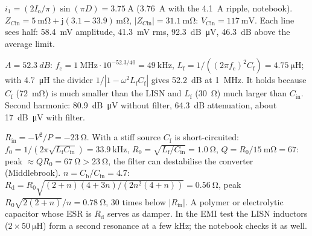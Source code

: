 


\begin{solutionblock}
	$i_1=(2I_\mathrm{o}/\pi)\sin(\pi D)=\SI{3.75}{\ampere}$ (\SI{3.76}{\ampere} with the \SI{4.1}{\ampere} ripple, notebook). $Z_{C\mathrm{in}}=\SI{5}{\milli\ohm}+\mathrm{j}(3.1-33.9)\,\si{\milli\ohm}$, $|Z_{C\mathrm{in}}|=\SI{31.1}{\milli\ohm}$: $V_{C\mathrm{in}}=\SI{117}{\milli\volt}$. Each line sees half: \SI{58.4}{\milli\volt} amplitude, \SI{41.3}{\milli\volt} rms, \SI{92.3}{dB\micro\volt}, \SI{46.3}{dB} above the average limit.
\end{solutionblock}


\begin{solutionblock}
	$A=\SI{52.3}{dB}$: $f_\mathrm{c}=\SI{1}{\mega\hertz}\cdot10^{-52.3/40}=\SI{49}{\kilo\hertz}$, $L_\mathrm{f}=1/((2\pi f_\mathrm{c})^2C_\mathrm{f})=\SI{4.75}{\micro\henry}$; with \SI{4.7}{\micro\henry} the divider $1/|1-\omega^2L_\mathrm{f}C_\mathrm{f}|$ gives \SI{52.2}{dB} at \SI{1}{\mega\hertz}. It holds because $C_\mathrm{f}$ (\SI{72}{\milli\ohm}) is much smaller than the LISN and $L_\mathrm{f}$ (\SI{30}{\ohm}) much larger than $C_\mathrm{in}$. Second harmonic: \SI{80.9}{dB\micro\volt} without filter, \SI{64.3}{dB} attenuation, about \SI{17}{dB\micro\volt} with filter.
\end{solutionblock}


\begin{solutionblock}
	$R_\mathrm{in}=-V^2/P=\SI{-23}{\ohm}$. With a stiff source $C_\mathrm{f}$ is short-circuited: $f_0=1/(2\pi\sqrt{L_\mathrm{f}C_\mathrm{in}})=\SI{33.9}{\kilo\hertz}$, $R_0=\sqrt{L_\mathrm{f}/C_\mathrm{in}}=\SI{1.0}{\ohm}$, $Q=R_0/\SI{15}{\milli\ohm}=67$: peak $\approx QR_0=\SI{67}{\ohm}>\SI{23}{\ohm}$, the filter can destabilise the converter (Middlebrook). $n=C_\mathrm{b}/C_\mathrm{in}=4.7$: $R_\mathrm{d}=R_0\sqrt{(2+n)(4+3n)/(2n^2(4+n))}=\SI{0.56}{\ohm}$, peak $R_0\sqrt{2(2+n)}/n=\SI{0.78}{\ohm}$, 30 times below $|R_\mathrm{in}|$. A polymer or electrolytic capacitor whose ESR is $R_\mathrm{d}$ serves as damper. In the EMI test the LISN inductors ($2\times\SI{50}{\micro\henry}$) form a second resonance at a few kHz; the notebook checks it as well.
\end{solutionblock}

